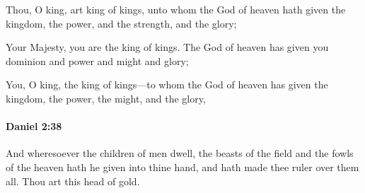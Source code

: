 			\begin{versebox}
					\item[BHS] 
					\item[LXX] 
					\item[ASV] Thou, O king, art king of kings, unto whom the God of heaven hath given the kingdom, the power, and the strength, and the glory;
					\item[NIV] Your Majesty, you are the king of kings. The God of heaven has given you dominion and power and might and glory;
					\item[NRSV] You, O king, the king of kings—to whom the God of heaven has given the kingdom, the power, the might, and the glory,
			\end{versebox}

		\paragraph{Daniel 2:38} %
			\label{DANIEL-2-38}

			And wheresoever the children of men dwell, the beasts of the field and the fowls of the heaven hath he given into thine hand, and hath made thee ruler over them all. Thou art this head of gold.


